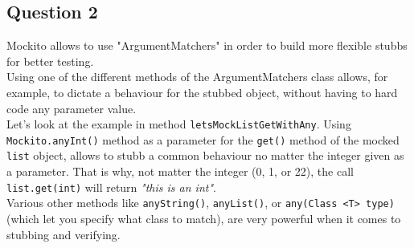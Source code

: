 \subsection*{Question 2}

\noindent Mockito allows to use "ArgumentMatchers" in order to build more flexible stubbs for better testing. \\ Using one of the different methods of the ArgumentMatchers class allows, for example, to dictate a behaviour for the stubbed object, without having to hard code any parameter value.\\ Let's look at the example in method \verb|letsMockListGetWithAny|. Using \verb|Mockito.anyInt()| method as a parameter for the \verb|get()| method of the mocked \verb|list| object, allows to stubb a common behaviour no matter the integer given as a parameter. That is why, not matter the integer (0, 1, or 22), the call \verb|list.get(int)| will return \textit{"this is an int"}.\\ Various other methods like \verb|anyString()|, \verb|anyList()|, or \verb|any(Class <T> type)| (which let you specify what class to match), are very powerful when it comes to stubbing and verifying.